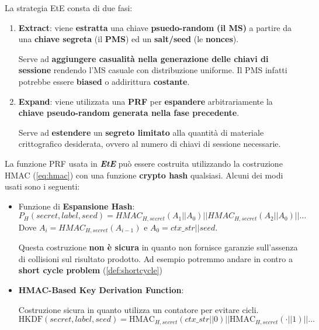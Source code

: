 \begin{definition}\label{def:ete}
La strategia EtE consta di due fasi:
\begin{enumerate}
    \item \textbf{Extract}: viene \textbf{estratta} una chiave\textbf{ psuedo-random} \textbf{(il MS)} a partire da una\textbf{ chiave segreta} (il \textbf{PMS}) ed un \textbf{salt/seed} (le \textbf{nonces}). \\
    \begin{remark}
    Serve ad \textbf{aggiungere casualità nella generazione delle chiavi di sessione} rendendo l'MS casuale con distribuzione uniforme. Il PMS infatti potrebbe essere \textbf{biased} o addirittura \textbf{costante}.
    \end{remark}
    \item \textbf{Expand}: viene utilizzata una \textbf{PRF} per \textbf{espandere} arbitrariamente la \textbf{chiave pseudo-random generata nella fase precedente}. \\
    \begin{remark}
    Serve ad \textbf{estendere} un\textbf{ segreto limitato} alla quantità di materiale crittografico desiderata, ovvero al numero di chiavi di sessione necessarie.
    \end{remark}
\end{enumerate}
\end{definition}
La funzione PRF usata in \textit{\textbf{EtE}} può essere costruita utilizzando la costruzione HMAC (\cref{eq:hmac}) con una funzione \textbf{crypto hash} qualsiasi. Alcuni dei modi usati sono i seguenti:
\begin{itemize}
    \item Funzione di \textbf{Espansione Hash}:
    \[P_H(secret, label,seed)=HMAC_{H,secret}(A_1||A_0)||HMAC_{H,secret}(A_2||A_0)||\dots
    \]
    Dove $A_i=HMAC_{H,secret}(A_{i-1})$ e $A_0=ctx\_str||seed$. 
    \begin{remark}
    Questa costruzione \textbf{non è sicura} in quanto non fornisce garanzie sull'assenza di collisioni sul risultato prodotto. Ad esempio potremmo andare in contro a \textbf{short cycle problem} (\cref{def:shortcycle})
    \end{remark}
    \item \textbf{HMAC-Based Key Derivation Function}:
    \begin{definition}[HKDF]\label{def:hkdf}
    Costruzione sicura in quanto utilizza un contatore per evitare cicli.
    \[\text{HKDF}(secret,label,seed)=\text{HMAC}_{H,secret}(ctx\_str||0)||\text{HMAC}_{H,secret}(\cdot||1)||\dots\]
    \end{definition}
\end{itemize}
